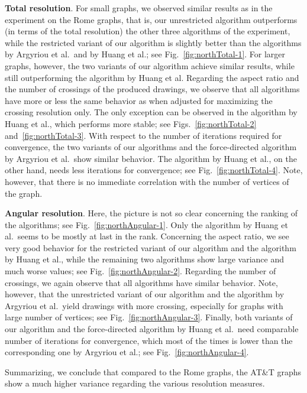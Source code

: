 \documentclass{comjnl}
\newcommand{\myparagraph}[1]{\medskip\noindent\textbf{#1}.}
\begin{document}
\myparagraph{Total resolution} For small graphs, we observed similar results as in the experiment on the Rome graphs, that is, our unrestricted algorithm outperforms (in terms of the total resolution) the other three algorithms of the experiment, while the restricted variant of our algorithm is slightly better than the algorithms by Argyriou et al.\ and by Huang et al.; see Fig.~\ref{fig:northTotal-1}. For larger graphs, however, the two variants of our algorithm achieve similar results, while still outperforming the algorithm by Huang et al. Regarding the aspect ratio and the number of crossings of the produced drawings, we observe that all algorithms have more or less the same behavior as when adjusted for maximizing the crossing resolution only. The only exception can be observed in the algorithm by Huang et al., which performs more stable; see Figs.~\ref{fig:northTotal-2} and~\ref{fig:northTotal-3}. With respect to the number of iterations required for convergence, the two variants of our algorithms and the force-directed algorithm by Argyriou et al.\ show similar behavior. The algorithm by Huang et al., on the other hand, needs less iterations for convergence; see Fig.~\ref{fig:northTotal-4}. Note, however, that there is no immediate correlation with the number of vertices of the graph.


\myparagraph{Angular resolution} Here, the picture is not so clear concerning the ranking of the algorithms; see Fig.~\ref{fig:northAngular-1}. Only the algorithm by Huang et al.\ seems to be mostly at last in the rank. Concerning the aspect ratio, we see very good behavior for the restricted variant of our algorithm and the algorithm by Huang et al., while the remaining two algorithms show large variance and much worse values; see Fig.~\ref{fig:northAngular-2}. Regarding the number of crossings, we again observe that all algorithms have similar behavior. Note, however, that the unrestricted variant of our algorithm and the algorithm by Argyriou et al.\ yield drawings with more crossing, especially for graphs with large number of vertices; see Fig.~\ref{fig:northAngular-3}. Finally, both variants of our algorithm and the force-directed algorithm by Huang et al.\ need comparable number of iterations for convergence, which most of the times is lower than the corresponding one by Argyriou et al.; see Fig.~\ref{fig:northAngular-4}.

Summarizing, we conclude that compared to the Rome graphs, the AT\&T graphs show a much higher variance regarding the various resolution measures. %
\end{document}
